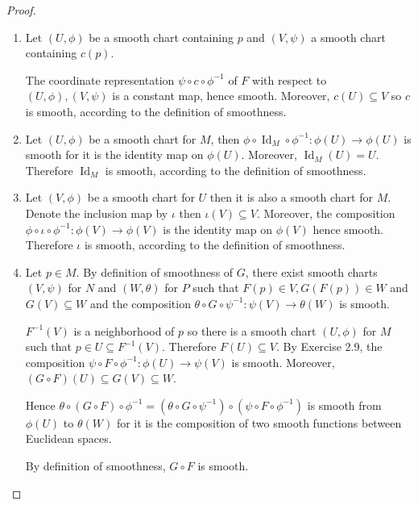 \begin{proof}
    \begin{enumerate}[itemsep=0pt,label={(\alph*)}]
        \item Let \( (U, \phi) \) be a smooth chart containing \( p \) and \( (V, \psi) \) a smooth chart containing \( c(p) \).

              The coordinate representation \( \psi \circ c \circ \phi^{-1} \) of \( F \) with respect to \( (U, \phi), (V, \psi) \) is a constant map, hence smooth. Moreover, \( c(U) \subseteq V \) so \( c \) is smooth, according to the definition of smoothness.
        \item Let \( (U, \phi) \) be a smooth chart for \( M \), then \( \phi \circ \operatorname{Id}_{M} \circ \phi^{-1}: \phi(U) \to \phi(U) \) is smooth for it is the identity map on \( \phi(U) \). Moreover, \( \operatorname{Id}_{M}(U) = U \). Therefore \( \operatorname{Id}_{M} \) is smooth, according to the definition of smoothness.
        \item Let \( (V, \phi) \) be a smooth chart for \( U \) then it is also a smooth chart for \( M \). Denote the inclusion map by \( \iota \) then \( \iota(V) \subseteq V \). Moreover, the composition \( \phi \circ \iota \circ \phi^{-1}: \phi(V) \to \phi(V) \) is the identity map on \( \phi(V) \) hence smooth. Therefore \( \iota \) is smooth, according to the definition of smoothness.
        \item Let \( p \in M \). By definition of smoothness of \( G \), there exist smooth charts \( (V, \psi) \) for \( N \) and \( (W, \theta) \) for \( P \) such that \( F(p) \in V, G(F(p)) \in W \) and \( G(V) \subseteq W \) and the composition \( \theta \circ G \circ \psi^{-1}: \psi(V) \to \theta(W) \) is smooth.

              \( F^{-1}(V) \) is a neighborhood of \( p \) so there is a smooth chart \( (U, \phi) \) for \( M \) such that \( p \in U \subseteq F^{-1}(V) \). Therefore \( F(U) \subseteq V \). By Exercise 2.9, the composition \( \psi \circ F \circ \phi^{-1}: \phi(U) \to \psi(V) \) is smooth. Moreover, \( (G \circ F)(U) \subseteq G(V) \subseteq W \).

              Hence \( \theta \circ (G \circ F) \circ \phi^{-1} = (\theta \circ G \circ \psi^{-1}) \circ (\psi \circ F \circ \phi^{-1}) \) is smooth from \( \phi(U) \) to \( \theta(W) \) for it is the composition of two smooth functions between Euclidean spaces.

              By definition of smoothness, \( G \circ F \) is smooth.
    \end{enumerate}
\end{proof}

